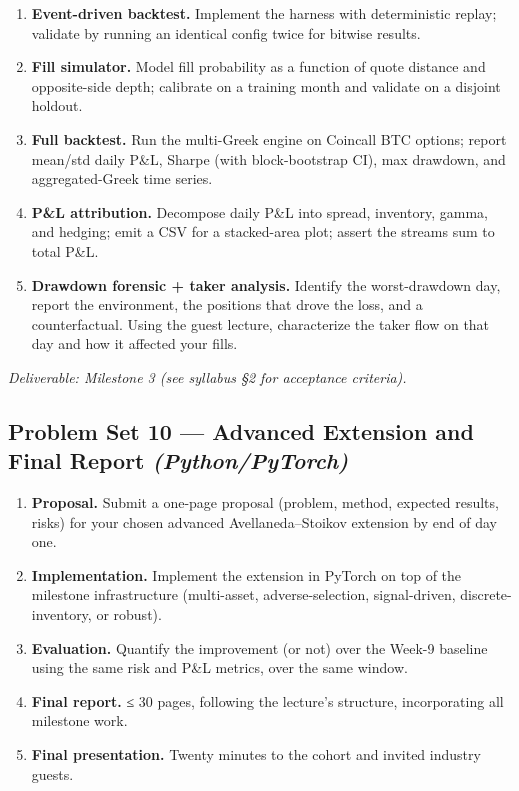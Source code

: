 \documentclass[
]{article}
\providecommand{\tightlist}{%
  \setlength{\itemsep}{0pt}\setlength{\parskip}{0pt}}
\begin{document}
\begin{enumerate}
\def\labelenumi{\arabic{enumi}.}
\tightlist
\item
  \textbf{Event-driven backtest.} Implement the harness with
  deterministic replay; validate by running an identical config twice
  for bitwise results.
\item
  \textbf{Fill simulator.} Model fill probability as a function of quote
  distance and opposite-side depth; calibrate on a training month and
  validate on a disjoint holdout.
\item
  \textbf{Full backtest.} Run the multi-Greek engine on Coincall BTC
  options; report mean/std daily P\&L, Sharpe (with block-bootstrap CI),
  max drawdown, and aggregated-Greek time series.
\item
  \textbf{P\&L attribution.} Decompose daily P\&L into spread,
  inventory, gamma, and hedging; emit a CSV for a stacked-area plot;
  assert the streams sum to total P\&L.
\item
  \textbf{Drawdown forensic + taker analysis.} Identify the
  worst-drawdown day, report the environment, the positions that drove
  the loss, and a counterfactual. Using the guest lecture, characterize
  the taker flow on that day and how it affected your fills.
\end{enumerate}

\emph{Deliverable: Milestone 3 (see syllabus §2 for acceptance
criteria).}

\subsection{\texorpdfstring{Problem Set 10 --- Advanced Extension and
Final Report
\emph{(Python/PyTorch)}}{Problem Set 10 --- Advanced Extension and Final Report (Python/PyTorch)}}\label{problem-set-10-advanced-extension-and-final-report-pythonpytorch}

\begin{enumerate}
\def\labelenumi{\arabic{enumi}.}
\tightlist
\item
  \textbf{Proposal.} Submit a one-page proposal (problem, method,
  expected results, risks) for your chosen advanced Avellaneda--Stoikov
  extension by end of day one.
\item
  \textbf{Implementation.} Implement the extension in PyTorch on top of
  the milestone infrastructure (multi-asset, adverse-selection,
  signal-driven, discrete-inventory, or robust).
\item
  \textbf{Evaluation.} Quantify the improvement (or not) over the Week-9
  baseline using the same risk and P\&L metrics, over the same window.
\item
  \textbf{Final report.} ≤ 30 pages, following the lecture's structure,
  incorporating all milestone work.
\item
  \textbf{Final presentation.} Twenty minutes to the cohort and invited
  industry guests.
\end{enumerate}
\end{document}
